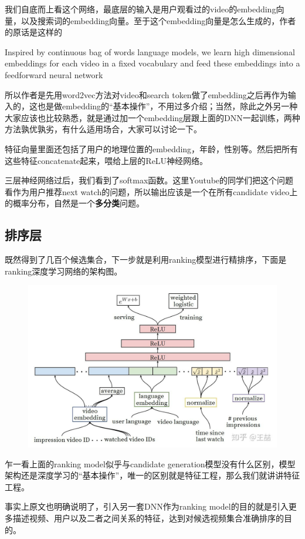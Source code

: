 \documentclass[12pt]{article}
\begin{document}
我们自底而上看这个网络，最底层的输入是用户观看过的video的embedding向量，以及搜索词的embedding向量。至于这个embedding向量是怎么生成的，作者的原话是这样的

Inspired by continuous bag of words language models, we learn high dimensional embeddings for each video in a fixed vocabulary and feed these embeddings into a feedforward neural network

所以作者是先用word2vec方法对video和search token做了embedding之后再作为输入的，这也是做embedding的“基本操作”，不用过多介绍；当然，除此之外另一种大家应该也比较熟悉，就是通过加一个embedding层跟上面的DNN一起训练，两种方法孰优孰劣，有什么适用场合，大家可以讨论一下。

特征向量里面还包括了用户的地理位置的embedding，年龄，性别等。然后把所有这些特征concatenate起来，喂给上层的ReLU神经网络。

三层神经网络过后，我们看到了softmax函数。这里Youtube的同学们把这个问题看作为用户推荐next watch的问题，所以输出应该是一个在所有candidate video上的概率分布，自然是一个\textbf{多分类}问题。

\subsection{排序层}
既然得到了几百个候选集合，下一步就是利用ranking模型进行精排序，下面是ranking深度学习网络的架构图。
\begin{figure}[H]
    \centering
    \includegraphics[width=.8\textwidth]{fig/Youtube_Ranking_Model.jpg}
\end{figure}

乍一看上面的ranking model似乎与candidate generation模型没有什么区别，模型架构还是深度学习的“基本操作”，唯一的区别就是特征工程，那么我们就讲讲特征工程。

事实上原文也明确说明了，引入另一套DNN作为ranking model的目的就是引入更多描述视频、用户以及二者之间关系的特征，达到对候选视频集合准确排序的目的。
\end{document}

